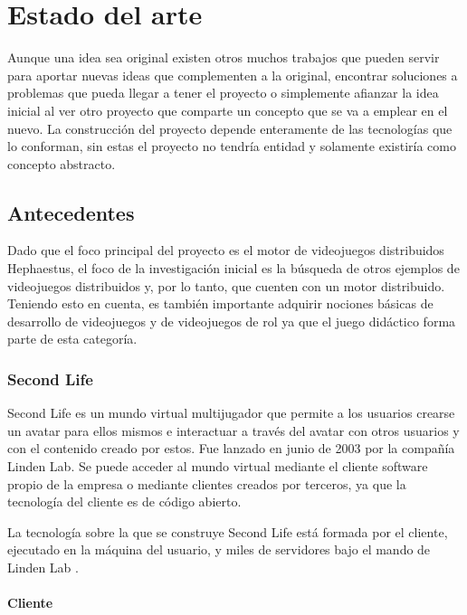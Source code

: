 \chapter{Estado del arte}\label{Cap3}

Aunque una idea sea original existen otros muchos trabajos que pueden servir para aportar nuevas ideas que complementen a la original, encontrar soluciones a problemas que pueda llegar a tener el proyecto o simplemente afianzar la idea inicial al ver otro proyecto que comparte un concepto que se va a emplear en el nuevo. La construcción del proyecto depende enteramente de las tecnologías que lo conforman, sin estas el proyecto no tendría entidad y solamente existiría como concepto abstracto.

\section{Antecedentes}

Dado que el foco principal del proyecto es el motor de videojuegos distribuidos Hephaestus, el foco de la investigación inicial es la búsqueda de otros ejemplos de videojuegos distribuidos y, por lo tanto, que cuenten con un motor distribuido. Teniendo esto en cuenta, es también importante adquirir nociones básicas de desarrollo de videojuegos y de videojuegos de rol ya que el juego didáctico forma parte de esta categoría.

\subsection{Second Life}

Second Life es un mundo virtual multijugador que permite a los usuarios crearse un avatar para ellos mismos e interactuar a través del avatar con otros usuarios y con el contenido creado por estos. Fue lanzado en junio de 2003 por la compañía Linden Lab. Se puede acceder al mundo virtual mediante el cliente software propio de la empresa o mediante clientes creados por terceros, ya que la tecnología del cliente es de código abierto.

La tecnología sobre la que se construye Second Life está formada por el cliente, ejecutado en la máquina del usuario, y miles de servidores bajo el mando de Linden Lab \cite{secondlife}.

\subsubsection{Cliente}

